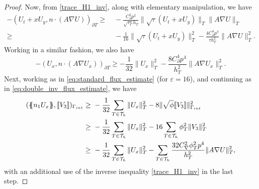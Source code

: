 \documentclass[10pt,a4paper]{amsart}
\newcommand{\Th}{\mathcal{T}_h}
\newcommand{\av}[1]{\{\kern-1.2mm \{{#1}\}\kern-1.2mm\}}
\newcommand{\avg }[1]{ \av{ #1}}
\newcommand{\cinv}{C_{\nabla}}
\newcommand{\cinvT}{C_{\partial}}
\newcommand{\gint}{\Gamma_{\rm int}}
\newcommand{\inner}[3]{({#1},{#2})_{{#3}}}
\newcommand{\jump}[1]{[\kern-0.6mm [{#1}]\kern-0.6mm]}
\newcommand{\norm}[2]{\|{#1}\|_{{#2}}}
\newcommand{\normal}{{n}}
\newcommand{\su}{\sum_{T \in \Th}}
\begin{document}
\begin{proof}
Now, from \eqref{trace_H1_inv}, along with elementary manipulation, we have
	\begin{equation*}\begin{split}
		-	   \inner{U_t+ x U_y}{\normal \cdot (A\nabla U)}{\partial T}
			\geq&\
		-	\frac{\cinvT ^2	p^2}{\sqrt{\tau_T}h_T} \norm{ \sqrt{\tau} (U_t+ x U_y)}{T}
	 \norm{A \nabla U}{ T}
			\\
			\geq &\
		-			\frac{1}{16}	\norm{ \sqrt{\tau} (U_t+ x U_y)}{T}^2 -  \frac{4\cinvT^4p^4}{\tau h_T^2}
			\norm{A \nabla U}{T}^2.
	\end{split}\end{equation*}
Working in a similar fashion, we also have
	\begin{equation*}
		-	\inner{U_x}{\normal \cdot (A\nabla U_x)}{\partial T}
			\geq
		-	\frac{1}{32}     \norm{U_x}{T}^2 -  \frac{ 8\cinvT^4p^4}{h_T^2}\norm{A\nabla U_x}{T}^2.
\end{equation*}
Next, working as in \eqref{eq:standard_flux_estimate} (for $\varepsilon=16$), and continuing as in \eqref{eq:double_inv_flux_estimate}, we have
	\begin{equation*}\begin{split}
			   \inner{\avg{\normal_1 U_x}}{\jump{V_3 }}{\gint}
			   \geq&\ - \frac{1}{32}  \su \norm{ U_x}{ T}^2 -  8\norm{\sqrt{\phi} \jump{V_3}}{\gint}^2\\
	   \geq&\ - \frac{1}{32}  \su \norm{ U_x}{ T}^2 -  16\su\phi_T^2\norm{V_3}{T}^2\\
	   \geq&\ - \frac{1}{32}  \su \norm{ U_x}{ T}^2 -  \su\frac{32\cinv^2\phi_T^2 p^4}{h_T^2}\norm{A\nabla U}{T}^2,
	\end{split}\end{equation*}
with an additional use of the inverse inequality \eqref{trace_H1_inv} in the last step.



\end{proof}
\end{document}
